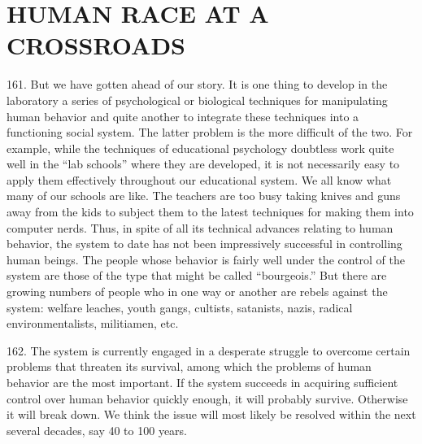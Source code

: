 \documentclass{article}
\begin{document}
\section{HUMAN RACE AT A CROSSROADS}

\hspace{0.5cm} 161. But we have gotten ahead of our story. It is one thing to develop in the laboratory a series 
of psychological or biological techniques for manipulating human behavior and quite another to 
integrate these techniques into a functioning social system. The latter problem is the more difficult 
of the two. For example, while the techniques of educational psychology doubtless work quite 
well in the “lab schools” where they are developed, it is not necessarily easy to apply them 
effectively throughout our educational system. We all know what many of our schools are 
like. The teachers are too busy taking knives and guns away from the kids to subject them to the 
latest techniques for making them into computer nerds. Thus, in spite of all its technical advances 
relating to human behavior, the system to date has not been impressively successful in controlling 
human beings. The people whose behavior is fairly well under the control of the system are those 
of the type that might be called “bourgeois.” But there are growing numbers of people who in one 
way or another are rebels against the system: welfare leaches, youth gangs, cultists, satanists, nazis, 
radical environmentalists, militiamen, etc. \vspace{\baselineskip}

162. The system is currently engaged in a desperate struggle to overcome certain problems that 
threaten its survival, among which the problems of human behavior are the most important. If the 
system succeeds in acquiring sufficient control over human behavior quickly enough, it will 
probably survive. Otherwise it will break down. We think the issue will most likely be resolved 
within the next several decades, say 40 to 100 years. \vspace{\baselineskip}
\end{document}
